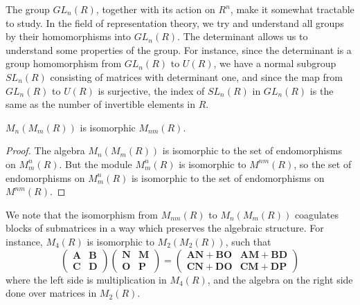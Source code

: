 The group $GL_n(R)$, together with its action on $R^n$, make it somewhat tractable to study. In the field of representation theory, we try and understand all groups by their homomorphisms into $GL_n(R)$. The determinant allows us to understand some properties of the group. For instance, since the determinant is a group homomorphism from $GL_n(R)$ to $U(R)$, we have a normal subgroup $SL_n(R)$ consisting of matrices with determinant one, and since the map from $GL_n(R)$ to $U(R)$ is surjective, the index of $SL_n(R)$ in $GL_n(R)$ is the same as the number of invertible elements in $R$.

\begin{theorem}
    $M_n(M_m(R))$ is isomorphic $M_{nm}(R)$.
\end{theorem}
\begin{proof}
    The algebra $M_n(M_m(R))$ is isomorphic to the set of endomorphisms on $M^n_m(R)$. But the module $M^n_m(R)$ is isomorphic to $M^{nm}(R)$, so the set of endomorphisms on $M^n_m(R)$ is isomorphic to the set of endomorphisms on $M^{nm}(R)$.
\end{proof}

We note that the isomorphism from $M_{nm}(R)$ to $M_n(M_m(R))$ coagulates blocks of submatrices in a way which preserves the algebraic structure. For instance, $M_{4}(R)$ is isomorphic to $M_2(M_2(R))$, such that
%
\[ \begin{pmatrix} \mathbf{A} & \mathbf{B} \\ \mathbf{C} & \mathbf{D} \end{pmatrix} \begin{pmatrix} \mathbf{N} & \mathbf{M} \\ \mathbf{O} & \mathbf{P} \end{pmatrix} = \begin{pmatrix} \mathbf{A} \mathbf{N} + \mathbf{B} \mathbf{O} & \mathbf{A} \mathbf{M} + \mathbf{B} \mathbf{D} \\ \mathbf{C} \mathbf{N} + \mathbf{D} \mathbf{O} & \mathbf{C} \mathbf{M} + \mathbf{D} \mathbf{P} \end{pmatrix} \]
%
where the left side is multiplication in $M_4(R)$, and the algebra on the right side done over matrices in $M_2(R)$.

